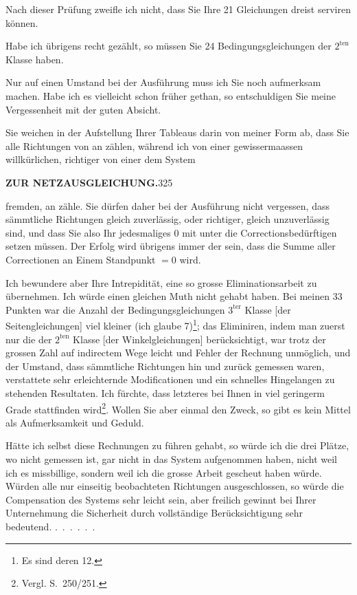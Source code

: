 Nach dieser Prüfung zweifle ich nicht, dass Sie Ihre 21 Gleichungen
dreist serviren können.

Habe ich übrigens recht gezählt, so müssen Sie 24 Bedingungsgleichungen
der $2^{\mathrm{ten}}$ Klasse haben.

Nur auf einen Umstand bei der Ausführung muss ich Sie noch aufmerksam
machen. Habe ich es vielleicht schon früher gethan, so entschuldigen
Sie meine Vergessenheit mit der guten Absicht.

Sie weichen in der Aufstellung Ihrer Tableaus darin von meiner Form
ab, dass Sie alle Richtungen von  an zählen, während ich
von einer gewissermaassen willkürlichen, richtiger von einer dem System\par
\clearpage
\noindent\textbf{ZUR NETZAUSGLEICHUNG.}\hfill325\par\medskip
\noindent fremden, an zähle. Sie dürfen daher bei der Ausführung nicht vergessen,
dass sämmtliche Richtungen gleich zuverlässig, oder richtiger, gleich unzuverlässig
sind, und dass Sie also Ihr jedesmaliges 0 mit unter die Correctionsbedürftigen
setzen müssen. Der Erfolg wird übrigens immer der sein, dass
die Summe aller Correctionen an Einem Standpunkt $=0$ wird.

\begingroup
\def\letterfivestars{*}
\makeatletter
\renewcommand{\@makefnmark}{\hbox{\normalfont[\textsuperscript{\letterfivestars})]}}
\renewcommand{\@makefntext}[1]{\parindent1em\noindent\hbox to2.4em{\hss[\textsuperscript{\letterfivestars})\ }#1]}
\makeatother
Ich bewundere aber Ihre Intrepidität, eine so grosse Eliminationsarbeit
zu übernehmen. Ich würde einen gleichen Muth nicht gehabt haben. Bei
meinen 33 Punkten war die Anzahl der Bedingungsgleichungen $3^{\mathrm{ter}}$ Klasse
[der Seitengleichungen] viel kleiner (ich glaube 7)\footnote{Es sind deren 12.}; das Eliminiren, indem
man zuerst nur die der $2^{\mathrm{ten}}$ Klasse [der Winkelgleichungen] berücksichtigt, war
trotz der grossen Zahl auf indirectem Wege leicht und Fehler der Rechnung
unmöglich, und der Umstand, dass sämmtliche Richtungen hin und zurück
gemessen waren, verstattete sehr erleichternde Modificationen und ein schnelles
Hingelangen zu stehenden Resultaten. Ich fürchte, dass letzteres bei Ihnen in
viel geringerm Grade stattfinden wird\def\letterfivestars{**}\footnote{Vergl. S.\ 250/251.}. Wollen Sie aber einmal den Zweck,
so gibt es kein Mittel als Aufmerksamkeit und Geduld.

Hätte ich selbst diese Rechnungen zu führen gehabt, so würde ich die
drei Plätze, wo nicht gemessen ist, gar nicht in das System aufgenommen
haben, nicht weil ich es missbillige, sondern weil ich die grosse Arbeit gescheut
haben würde. Würden alle nur einseitig beobachteten Richtungen ausgeschlossen,
so würde die Compensation des Systems sehr leicht sein, aber
freilich gewinnt bei Ihrer Unternehmung die Sicherheit durch vollständige
Berücksichtigung sehr bedeutend. .\ .\ .\ .\ .\ .

